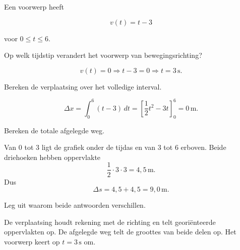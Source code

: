 \documentclass{ximera}
\begin{document}
\begin{oefening}{\oefU\ESS}

Een voorwerp heeft

\[v(t)=t-3\]

voor $0\leq t\leq6$.

\begin{question}

Op welk tijdstip verandert het voorwerp van bewegingsrichting?

\begin{oplossing}
\[v(t)=0\Longrightarrow t-3=0\Longrightarrow t=3\,\mathrm{s}.\]
\end{oplossing}

\end{question}

\begin{question}

Bereken de verplaatsing over het volledige interval.

\begin{oplossing}
\[\Delta x=\int_0^6(t-3)\,dt =\left[\frac12t^2-3t\right]_0^6=0\,\mathrm{m}.\]
\end{oplossing}

\end{question}

\begin{question}

Bereken de totale afgelegde weg.

\begin{oplossing}
Van \(0\) tot \(3\) ligt de grafiek onder de tijdas en van \(3\) tot \(6\) erboven. Beide driehoeken hebben oppervlakte
\[\frac12\cdot3\cdot3=4,5\,\mathrm{m}.\]
Dus
\[\Delta s=4,5+4,5=9,0\,\mathrm{m}.\]
\end{oplossing}

\end{question}

\begin{question}

Leg uit waarom beide antwoorden verschillen.

\begin{oplossing}
De verplaatsing houdt rekening met de richting en telt georiënteerde oppervlakten op. De afgelegde weg telt de groottes van beide delen op. Het voorwerp keert op \(t=3\,\mathrm{s}\) om.
\end{oplossing}

\end{question}

\end{oefening}
\end{document}
